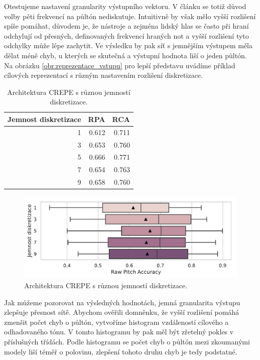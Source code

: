 Otestujeme nastavení granularity výstupního vektoru. V článku \cite{Kim2018} se totiž důvod volby pěti frekvencí na půltón nediskutuje. Intuitivně by však mělo vyšší rozlišení spíše pomáhat, důvodem je, že nástroje a zejména lidský hlas se často při hraní odchylují od přesných, definovaných frekvencí hraných not a vyšší rozlišení tyto odchylky může lépe zachytit. Ve výsledku by pak síť s jemnějším výstupem měla dělat méně chyb, u kterých se skutečná a výstupní hodnota liší o jeden půltón. Na obrázku \ref{obr:reprezentace_vstupu} pro lepší představu uvádíme příklad cílových reprezentací s různým nastavením rozlišení diskretizace.

\begin{table}[h!]

\centering
    \begin{tabular}{rrr}
    \toprule
    Jemnost diskretizace &   RPA &   RCA \\
    \midrule
                    1 & 0.612 & 0.711 \\
                    3 & 0.653 & 0.760 \\
                    5 & 0.666 & 0.771 \\
                    7 & 0.654 & 0.763 \\
                    9 & 0.658 & 0.760 \\
    \bottomrule
    \end{tabular}

\caption{Architektura CREPE s různou jemností diskretizace.}\label{tab:crepe_diskretizace}

\end{table}

\begin{figure}[h]\centering
    \includegraphics[scale=0.6]{../img/figures/crepe_diskretizace.pdf}
\caption{Architektura CREPE s různou jemností diskretizace.}\label{obr:crepe_diskretizace}
\end{figure}

Jak můžeme pozorovat na výsledných hodnotách, jemná granularita výstupu zlepšuje přesnost sítě. Abychom ověřili domněnku, že vyšší rozlišení pomáhá zmenšit počet chyb o půltón, vytvoříme histogram vzdáleností cílového a odhadovaného tónu. V tomto histogramu by pak měl být zřetelný pokles v příslušných třídách. Podle histogramu se počet chyb o půltón mezi zkoumanými modely liší téměř o polovinu, zlepšení tohoto druhu chyb je tedy podstatné.

